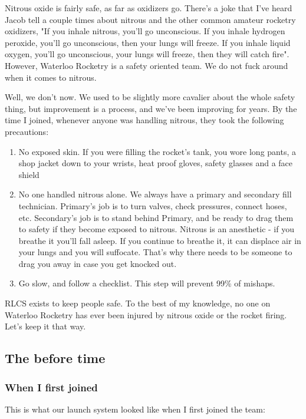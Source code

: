 \documentclass[11pt]{article}
\begin{document}
Nitrous oxide is fairly safe, as far as oxidizers go. There's a joke that I've
heard Jacob tell a couple times about nitrous and the other common amateur
rocketry oxidizers, "If you inhale nitrous, you'll go unconscious. If you inhale
hydrogen peroxide, you'll go unconscious, then your lungs will freeze. If you
inhale liquid oxygen, you'll go unconscious, your lungs will freeze, then they
will catch fire". However, Waterloo Rocketry is a safety oriented team. We do
not fuck around when it comes to nitrous.

Well, we don't now. We used to be slightly more cavalier about the whole safety
thing, but improvement is a process, and we've been improving for years. By the
time I joined, whenever anyone was handling nitrous, they took the following
precautions:

\begin{enumerate}
\item No exposed skin. If you were filling the rocket's tank, you wore long pants,
a shop jacket down to your wrists, heat proof gloves, safety glasses and a
face shield
\item No one handled nitrous alone. We always have a primary and secondary fill
technician. Primary's job is to turn valves, check pressures, connect hoses,
etc. Secondary's job is to stand behind Primary, and be ready to drag them to
safety if they become exposed to nitrous. Nitrous is an anesthetic - if you
breathe it you'll fall asleep. If you continue to breathe it, it can displace
air in your lungs and you will suffocate. That's why there needs to be
someone to drag you away in case you get knocked out.
\item Go slow, and follow a checklist. This step will prevent 99\% of mishaps.
\end{enumerate}

RLCS exists to keep people safe. To the best of my knowledge, no one
on Waterloo Rocketry has ever been injured by nitrous oxide or the
rocket firing. Let's keep it that way.

\subsection{The before time}
\label{sec:org0734619}
\subsubsection{When I first joined}
\label{sec:org3f01663}

This is what our launch system looked like when I first joined the team:
\end{document}
